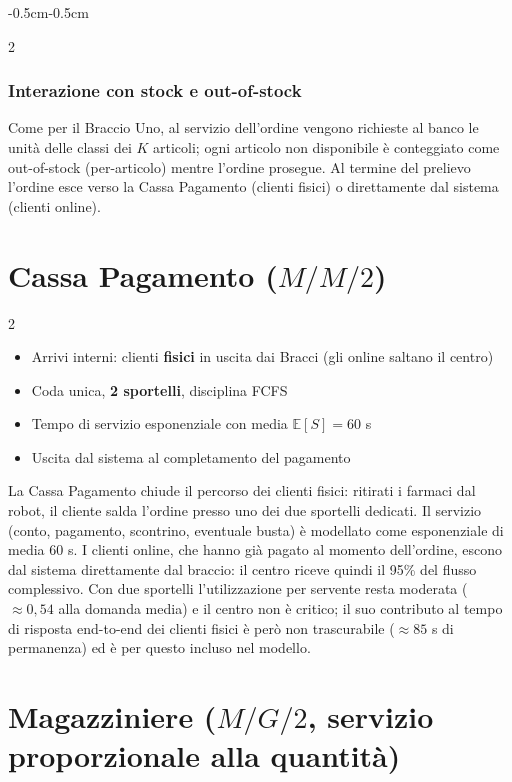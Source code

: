 \documentclass{article}
\newcommand{\beforesectiongap}{\vspace*{\baselineskip}}
\begin{document}
\begin{adjustwidth}{-0.5cm}{-0.5cm}
\begin{multicols}{2}
\subsubsection*{Interazione con stock e out-of-stock}
Come per il Braccio Uno, al servizio dell'ordine vengono richieste al banco le unità delle classi
dei $K$ articoli; ogni articolo non disponibile è conteggiato come out-of-stock (per-articolo)
mentre l'ordine prosegue. Al termine del prelievo l'ordine esce verso la Cassa Pagamento (clienti
fisici) o direttamente dal sistema (clienti online).
\end{multicols}
\beforesectiongap
\section*{Cassa Pagamento ($M/M/2$)}
\begin{multicols}{2}
\begin{itemize}
    \item[\ding{112}] Arrivi interni: clienti \textbf{fisici} in uscita dai Bracci (gli online
    saltano il centro)
    \item[\ding{112}] Coda unica, \textbf{2 sportelli}, disciplina \textsc{FCFS}
    \item[\ding{112}] Tempo di servizio esponenziale con media $\mathbb{E}[S] = 60$ s
    \item[\ding{112}] Uscita dal sistema al completamento del pagamento
\end{itemize}

La Cassa Pagamento chiude il percorso dei clienti fisici: ritirati i farmaci dal robot, il cliente
salda l'ordine presso uno dei due sportelli dedicati. Il servizio (conto, pagamento, scontrino,
eventuale busta) è modellato come esponenziale di media 60 s. I clienti online, che hanno già
pagato al momento dell'ordine, escono dal sistema direttamente dal braccio: il centro riceve
quindi il 95\% del flusso complessivo. Con due sportelli l'utilizzazione per servente resta
moderata ($\approx 0{,}54$ alla domanda media) e il centro non è critico; il suo contributo al
tempo di risposta end-to-end dei clienti fisici è però non trascurabile ($\approx 85$ s di
permanenza) ed è per questo incluso nel modello.
\end{multicols}
\beforesectiongap
\section*{Magazziniere ($M/G/2$, servizio proporzionale alla quantità)}


\end{adjustwidth}
\end{document}
